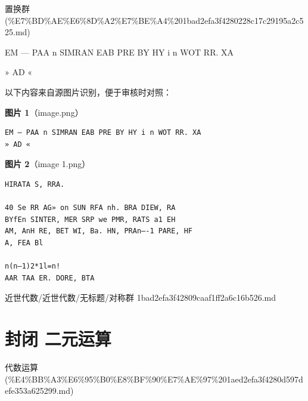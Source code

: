 \begin{note}[来源上级主题]

置换群 (\%E7\%BD\%AE\%E6\%8D\%A2\%E7\%BE\%A4\%201bad2efa3f4280228c17c29195a2c525.md)

\end{note}

\begin{note}[对称群]

EM — PAA n SIMRAN EAB PRE BY HY i n WOT RR. XA

» AD «

\end{note}

\begin{note}
以下内容来自源图片识别，便于审核时对照：

\textbf{图片 1}（image.png）
\begin{Verbatim}[fontsize=\small]
EM — PAA n SIMRAN EAB PRE BY HY i n WOT RR. XA
» AD «
\end{Verbatim}

\textbf{图片 2}（image 1.png）
\begin{Verbatim}[fontsize=\small]
HIRATA S, RRA.

40 Se RR AG» on SUN RFA nh. BRA DIEW, RA
BYfEn SINTER, MER SRP we PMR, RATS a1 EH
AM, AnH RE, BET WI, Ba. HN, PRAn—-1 PARE, HF
A, FEA Bl

n(n—1)2*1l=n!
AAR TAA ER. DORE, BTA
\end{Verbatim}

\end{note}

\begin{note}[来源路径]

近世代数/近世代数/无标题/对称群 1bad2efa3f42809caaf1ff2a6c16b526.md

\end{note}

\section*{封闭 二元运算}

\begin{note}[来源上级主题]

代数运算 (\%E4\%BB\%A3\%E6\%95\%B0\%E8\%BF\%90\%E7\%AE\%97\%201aed2efa3f4280d597defe353a625299.md)

\end{note}

